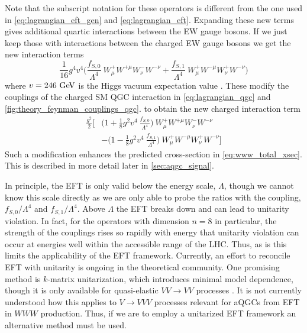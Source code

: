 Note that the subscript notation for these operators is different 
from the one used in \eqn\eqref{eq:lagrangian_eft_gen} and \eqn\eqref{eq:lagrangian_eft}.
Expanding these new terms gives additional quartic interactions between 
the EW gauge bosons. If we just keep those with interactions between
the charged EW gauge bosons we get the new interaction terms
\begin{equation}
\frac{1}{16} g^4 v^4 \Big(  \frac{f_{S,0}}{\Lambda^4}~W_{\mu}^+ W^{+\mu} W_{\nu}^- W^{-\nu} + \frac{f_{S,1}}{\Lambda^4}~W_{\mu}^+ W^{-\mu} W_{\nu}^+W^{-\nu} \Big) 
\end{equation}
where $v = 246 \GeV$ is the Higgs vacuum expectation value \cite{PDG:2014}.
These modify the couplings of 
the charged SM QGC interaction in \eqn\eqref{eq:lagrangian_qgc}
and \fig\ref{fig:theory_feynman_couplings_qgc}. 
to obtain the new charged interaction term
\begin{equation}
\begin{aligned}
\frac{g^2}{2}\Bigg[&\Big(1 +  \frac{1}{8} g^2 v^4~ \frac{f_{S,0}}{\Lambda^4} \Big) ~W_{\mu}^+ W^{+\mu} W_{\nu}^- W^{-\nu} \\&- \Big( 1 - \frac{1}{8} g^2 v^4~\frac{f_{S,1}}{\Lambda^4}\Big) ~W_{\mu}^+ W^{-\mu} W_{\nu}^+W^{-\nu}\Bigg] 
\end{aligned}
\end{equation}
Such a modification enhances the predicted 
cross-section in \eqn\eqref{eq:www_total_xsec}. This is described in more
detail later in \sec\ref{sec:aqgc_signal}.


In principle, the EFT is only valid below the energy scale, $\Lambda$, 
though we cannot know this scale directly as we are only able to probe
the ratios with the coupling, $f_{S,0}/\Lambda^4$ and $f_{S,1}/\Lambda^4$.
Above $\Lambda$ the EFT breaks down and can lead to unitarity violation.
In fact, for the operators with dimension $n=8$ in particular, 
the strength of the couplings rises
so rapidly with energy that unitarity violation can occur
at energies well within the accessible
range of the LHC.  Thus, as is 
this limits the applicability of the EFT framework.
Currently, an effort to reconcile EFT with unitarity is ongoing
in the theoretical community. 
One promising method is $k$-matrix unitarization, which introduces
minimal model dependence, though it is only available for quasi-elastic
$VV\rightarrow VV$ processes \cite{Kilian:2014zja}. It is not currently
understood how this applies to $V\rightarrow VVV$ processes 
relevant for aQGCs from EFT in $WWW$ production. Thus, if we 
are to employ a unitarized EFT framework an alternative method must
be used.

